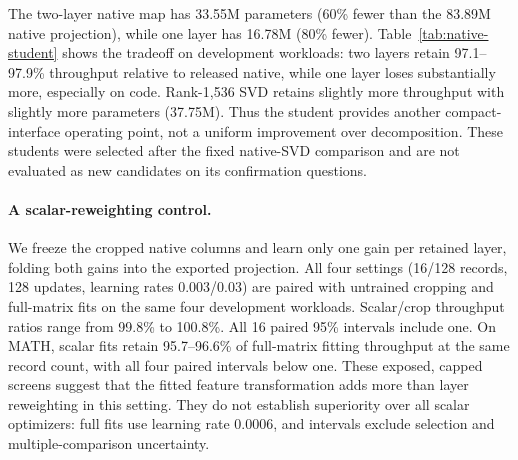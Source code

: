 \documentclass{article}
\begin{document}
The two-layer native map has 33.55M parameters (60\% fewer than the
83.89M native projection), while one layer has 16.78M (80\% fewer).
Table~\ref{tab:native-student} shows the tradeoff on development workloads:
two layers retain 97.1--97.9\% throughput relative to released native,
while one layer loses substantially more, especially on code. Rank-1,536
SVD retains slightly more throughput with slightly more parameters
(37.75M). Thus the student provides another compact-interface operating
point, not a uniform improvement over decomposition. These students were
selected after the fixed native-SVD comparison and are not evaluated as
new candidates on its confirmation questions.

\begin{table}[H]
\centering\small

\caption{Native interface students versus released-native throughput.
GSM8K/MATH use 32 questions and a 128-token cap, code eight MBPP
requests and a 512-token cap, and dialogue eight two-turn conversations
with a 256-token per-turn cap. All are exposed development workloads.}
\label{tab:native-student}
\end{table}







\begin{table}[H]
\centering\small

\caption{Native initialization controls. Values are throughput percentages
relative to each worker's full repacked-native projection. Crop uses no
fitting. Rnd and Inh denote random and inherited-column initialization,
with 16 or 128 records. Ref512 is the original 512-record compact map.
All compact maps retain two layers and 33.55M projection weights instead
of 83.89M. Each row pairs all seven methods. Short and long budgets are
separate campaigns on the same exposed requests, with a 512-token cap.
Full paired request intervals are retained in the accompanying artifacts.}
\label{tab:native-initialization}
\end{table}

\paragraph{A scalar-reweighting control.}
We freeze the cropped native columns and learn only one gain per retained
layer, folding both gains into the exported projection. All four settings
(16/128 records, 128 updates, learning rates 0.003/0.03) are paired with
untrained cropping and full-matrix fits on the same four development
workloads. Scalar/crop throughput ratios range from 99.8\% to 100.8\%.
All 16 paired 95\% intervals include one. On MATH, scalar fits retain
95.7--96.6\% of full-matrix fitting throughput at the same record count,
with all four paired intervals below one. These exposed, capped screens
suggest that the fitted feature transformation adds more than layer
reweighting in this setting. They do not establish superiority over all
scalar optimizers: full fits use learning rate 0.0006, and intervals
exclude selection and multiple-comparison uncertainty.
\end{document}
